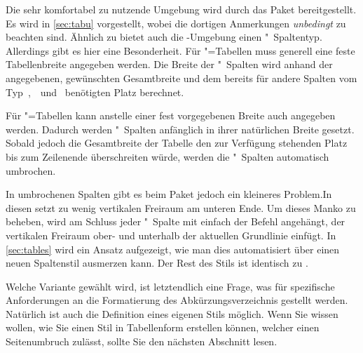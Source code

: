 \documentclass[%
  english,ngerman,%
  geometry=no,DIV=12,automark,%
]{tudscrartcl}
\begin{document}
Die sehr komfortabel zu nutzende Umgebung  wird durch das 
Paket  bereitgestellt. Es wird in \autoref{sec:tabu} vorgestellt, 
wobei die dortigen Anmerkungen \emph{unbedingt} zu beachten sind. Ähnlich zu 
 bietet auch die -Umgebung einen 
"~Spaltentyp. Allerdings gibt es hier eine Besonderheit. Für 
"=Tabellen muss generell eine feste Tabellenbreite 
angegeben werden. Die Breite der "~Spalten wird anhand der 
angegebenen, gewünschten Gesamtbreite und dem bereits für andere Spalten vom 
Typ~,~~und~ benötigten Platz berechnet. 

Für "=Tabellen kann anstelle einer fest vorgegebenen Breite 
auch  angegeben werden. Dadurch werden "~Spalten 
anfänglich in ihrer natürlichen Breite gesetzt. Sobald jedoch die Gesamtbreite 
der Tabelle den zur Verfügung stehenden Platz bis zum Zeilenende überschreiten 
würde, werden die "~Spalten automatisch umbrochen. 

In umbrochenen Spalten gibt es beim Paket  jedoch ein kleineres 
Problem.In diesen setzt  zu wenig vertikalen Freiraum am unteren 
Ende. Um dieses Manko zu beheben, wird am Schluss jeder "~Spalte mit 
 einfach der Befehl  angehängt, der 
vertikalen Freiraum ober- und unterhalb der aktuellen Grundlinie einfügt. In 
\autoref{sec:tables} wird ein Ansatz aufgezeigt, wie man dies automatisiert 
über einen neuen Spaltenstil ausmerzen kann. Der Rest des Stils ist identisch 
zu .
%
\CodeHook{\let\newglossarystyle\renewglossarystyle}
\begin{Preamble*}

\end{Preamble*}
\begin{Hint}
\printacronyms[style=acrotabu]
\end{Hint}
\begin{quoting}[rightmargin=0pt]
\glsdisablehyper
\vspace*{-\baselineskipglue}
\InputCode
\end{quoting}
%
Welche Variante gewählt wird, ist letztendlich eine Frage, was für spezifische 
Anforderungen an die Formatierung des Abkürzungsverzeichnis gestellt werden. 
Natürlich ist auch die Definition eines eigenen Stils möglich. Wenn Sie wissen 
wollen, wie Sie einen Stil in Tabellenform erstellen können, welcher einen 
Seitenumbruch zulässt, sollte Sie den nächsten Abschnitt lesen.
\end{document}
